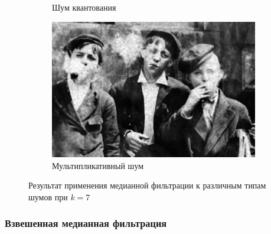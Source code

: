 \begin{figure}[ht]
\begin{subfigure}[b]{0.5\linewidth}
      \caption{Шум квантования} 
      \label{median_7:e}
    \end{subfigure}%
    \begin{subfigure}[b]{0.5\linewidth}
        \centering
        \includegraphics[width=0.95\linewidth]{../Median_FIlter/Median_Speckle_noise_(k=7).jpg} 
        \caption{Мультипликативный шум} 
        \label{median_7:f} 
    \end{subfigure} 
    \caption{Результат применения медианной фильтрации к различным типам шумов при $k = 7$}
    \label{img:median_7} 
\end{figure}
\FloatBarrier

\subsubsection{Взвешенная медианная фильтрация}


